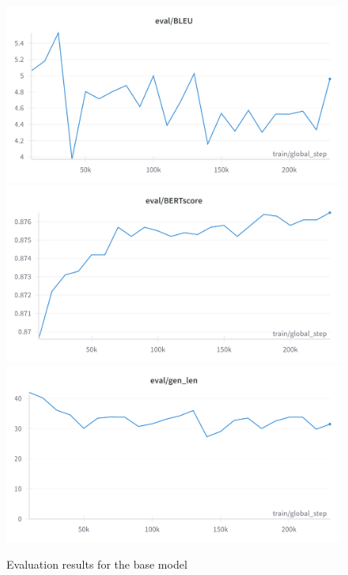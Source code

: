 \begin{figure}[H]
    \centering %
    \includegraphics[scale=0.12]{figs/base_bleu.png} \\
    \includegraphics[scale=0.12]{figs/base_bertscore.png} \\
    \centering 
    \includegraphics[scale=0.12]{figs/base_genlen.png}
    \caption{Evaluation results for the base model}
    \label{fig:base_model_interim_metrics}
\end{figure}

